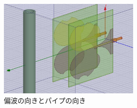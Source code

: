 \documentclass[a4paper,12pt]{jsreport}
\begin{document}
 \begin{figure}[h]
  \begin{center}
   \includegraphics[width=7cm]{./image/antennaimage.png}
  \caption{偏波の向きとパイプの向き}\label{偏波の向きとパイプの向き}
  \end{center}
  \end{figure}
\end{document}
